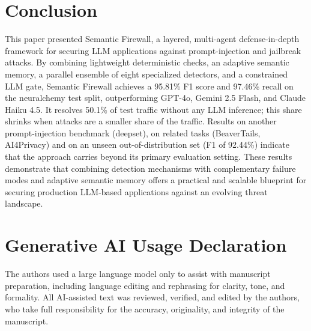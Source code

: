 \documentclass[runningheads]{llncs}
\newif\ifrev
\newcommand{\rev}[1]{\ifrev\hl{#1}\else#1\fi}                  %
\begin{document}
\section{Conclusion}\label{sec:conclusion}
This paper presented Semantic Firewall, a layered, multi-agent defense-in-depth framework for securing LLM applications against prompt-injection and jailbreak attacks. By combining lightweight deterministic checks, an adaptive semantic memory, a parallel ensemble of eight specialized detectors, and a constrained LLM gate, Semantic Firewall achieves a \rev{95.81\%} F1 score and \rev{97.46\%} recall on the neuralchemy \rev{test split}, outperforming GPT-4o, Gemini 2.5 Flash, and \rev{Claude Haiku 4.5}. It resolves \rev{50.1\%} of \rev{test} traffic without any LLM inference\rev{; this share shrinks when attacks are a smaller share of the traffic}. \rev{Results on another prompt-injection benchmark (deepset), on related tasks (BeaverTails, AI4Privacy) and on an unseen out-of-distribution set (F1 of 92.44\%) indicate that the approach carries beyond its primary evaluation setting.} These results demonstrate that combining detection mechanisms with complementary failure modes and adaptive semantic memory offers a practical and scalable blueprint for securing production LLM-based applications against an evolving threat landscape.

\section*{Generative AI Usage Declaration}
The authors used a large language model only to assist with manuscript preparation, including language editing and rephrasing for clarity, tone, and formality. All AI-assisted text was reviewed, verified, and edited by the authors, who take full responsibility for the accuracy, originality, and integrity of the manuscript.
\end{document}
